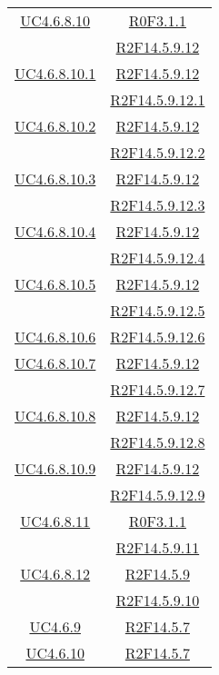 \begin{longtable}{|c|c|}
\hline
\hyperlink{UC4.6.8.10}{UC4.6.8.10} & \hyperlink{R0F3.1.1}{R0F3.1.1}\\
& \hyperlink{R2F14.5.9.12}{R2F14.5.9.12}\\
\hline
\hyperlink{UC4.6.8.10.1}{UC4.6.8.10.1} & \hyperlink{R2F14.5.9.12}{R2F14.5.9.12}\\
& \hyperlink{R2F14.5.9.12.1}{R2F14.5.9.12.1}\\
\hline
\hyperlink{UC4.6.8.10.2}{UC4.6.8.10.2} & \hyperlink{R2F14.5.9.12}{R2F14.5.9.12}\\
& \hyperlink{R2F14.5.9.12.2}{R2F14.5.9.12.2}\\
\hline
\hyperlink{UC4.6.8.10.3}{UC4.6.8.10.3} & \hyperlink{R2F14.5.9.12}{R2F14.5.9.12}\\
& \hyperlink{R2F14.5.9.12.3}{R2F14.5.9.12.3}\\
\hline
\hyperlink{UC4.6.8.10.4}{UC4.6.8.10.4} & \hyperlink{R2F14.5.9.12}{R2F14.5.9.12}\\
& \hyperlink{R2F14.5.9.12.4}{R2F14.5.9.12.4}\\
\hline
\hyperlink{UC4.6.8.10.5}{UC4.6.8.10.5} & \hyperlink{R2F14.5.9.12}{R2F14.5.9.12}\\
& \hyperlink{R2F14.5.9.12.5}{R2F14.5.9.12.5}\\
\hline
\hyperlink{UC4.6.8.10.6}{UC4.6.8.10.6} & \hyperlink{R2F14.5.9.12.6}{R2F14.5.9.12.6}\\
\hline
\hyperlink{UC4.6.8.10.7}{UC4.6.8.10.7} & \hyperlink{R2F14.5.9.12}{R2F14.5.9.12}\\
& \hyperlink{R2F14.5.9.12.7}{R2F14.5.9.12.7}\\
\hline
\hyperlink{UC4.6.8.10.8}{UC4.6.8.10.8} & \hyperlink{R2F14.5.9.12}{R2F14.5.9.12}\\
& \hyperlink{R2F14.5.9.12.8}{R2F14.5.9.12.8}\\
\hline
\hyperlink{UC4.6.8.10.9}{UC4.6.8.10.9} & \hyperlink{R2F14.5.9.12}{R2F14.5.9.12}\\
& \hyperlink{R2F14.5.9.12.9}{R2F14.5.9.12.9}\\
\hline
\hyperlink{UC4.6.8.11}{UC4.6.8.11} & \hyperlink{R0F3.1.1}{R0F3.1.1}\\
& \hyperlink{R2F14.5.9.11}{R2F14.5.9.11}\\
\hline
\hyperlink{UC4.6.8.12}{UC4.6.8.12} & \hyperlink{R2F14.5.9}{R2F14.5.9}\\
& \hyperlink{R2F14.5.9.10}{R2F14.5.9.10}\\
\hline
\hyperlink{UC4.6.9}{UC4.6.9} & \hyperlink{R2F14.5.7}{R2F14.5.7}\\
\hline
\hyperlink{UC4.6.10}{UC4.6.10} & \hyperlink{R2F14.5.7}{R2F14.5.7}\\

\end{longtable}
